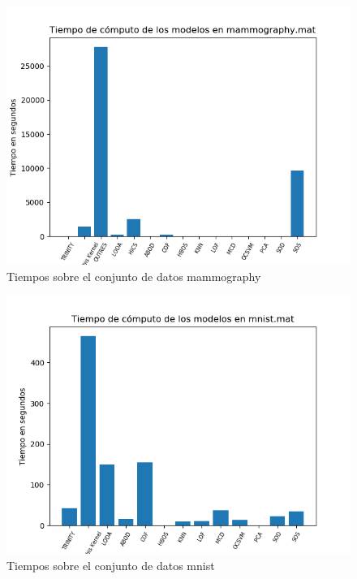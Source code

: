 \begin{figure}[H]
	\centering
	\includegraphics[scale=0.7]{imagenes/imgs-exp1/times/mammography}
	\caption{Tiempos sobre el conjunto de datos mammography}
	\label{mammography_times}
\end{figure}

\begin{figure}[H]
	\centering
	\includegraphics[scale=0.7]{imagenes/imgs-exp1/times/mnist}
	\caption{Tiempos sobre el conjunto de datos mnist}
	\label{mnist_times}
\end{figure}

